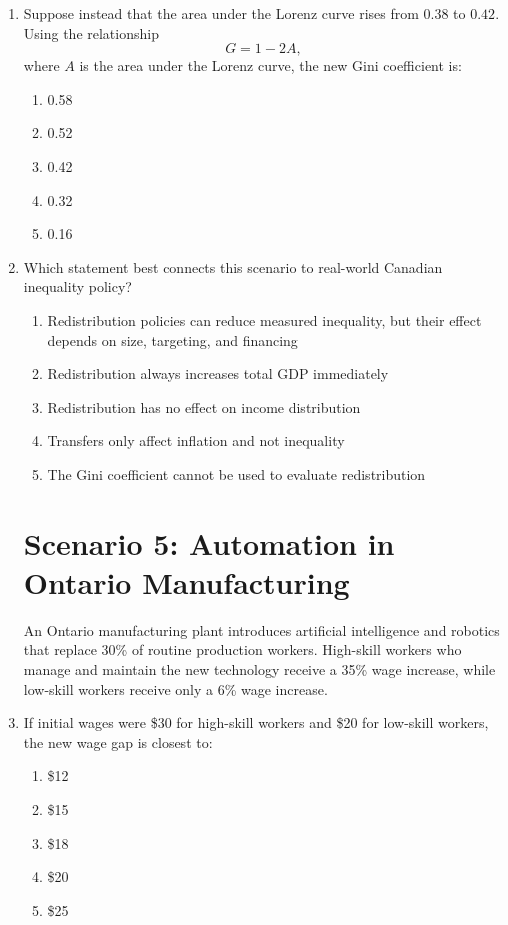 \documentclass[12pt]{article}
\begin{document}
\begin{enumerate}[label=\textbf{\arabic*.}]
\item Suppose instead that the area under the Lorenz curve rises from \(0.38\) to \(0.42\). Using the relationship
\[
G = 1 - 2A,
\]
where \(A\) is the area under the Lorenz curve, the new Gini coefficient is:
\begin{enumerate}[label=\Alph*.]
\item 0.58
\item 0.52
\item 0.42
\item 0.32
\item 0.16
\end{enumerate}
\newpage
\item Which statement best connects this scenario to real-world Canadian inequality policy?
\begin{enumerate}[label=\Alph*.]
\item Redistribution policies can reduce measured inequality, but their effect depends on size, targeting, and financing
\item Redistribution always increases total GDP immediately
\item Redistribution has no effect on income distribution
\item Transfers only affect inflation and not inequality
\item The Gini coefficient cannot be used to evaluate redistribution
\end{enumerate}



\section*{Scenario 5: Automation in Ontario Manufacturing}

An Ontario manufacturing plant introduces artificial intelligence and robotics that replace 30\% of routine production workers. High-skill workers who manage and maintain the new technology receive a 35\% wage increase, while low-skill workers receive only a 6\% wage increase.

\item If initial wages were \$30 for high-skill workers and \$20 for low-skill workers, the new wage gap is closest to:
\begin{enumerate}[label=\Alph*.]
\item \$12
\item \$15
\item \$18
\item \$20
\item \$25
\end{enumerate}


\end{enumerate}
\end{document}
